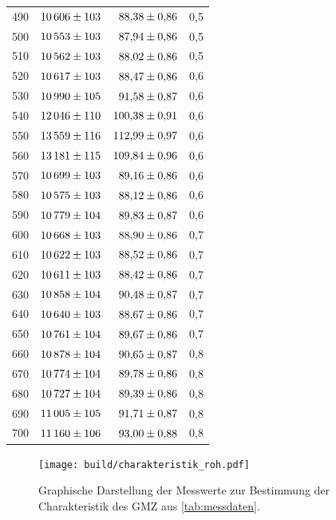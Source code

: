 \begin{longtable}{c r r c}
    490 & $\num{10606+-103}$ & $\num{ 88.38+-0.86}$ & 0,5 \\
    500 & $\num{10553+-103}$ & $\num{ 87.94+-0.86}$ & 0,5 \\
    510 & $\num{10562+-103}$ & $\num{ 88.02+-0.86}$ & 0,5 \\
    520 & $\num{10617+-103}$ & $\num{ 88.47+-0.86}$ & 0,6 \\
    530 & $\num{10990+-105}$ & $\num{ 91.58+-0.87}$ & 0,6 \\
    540 & $\num{12046+-110}$ & $\num{100.38+-0.91}$ & 0,6 \\
    550 & $\num{13559+-116}$ & $\num{112.99+-0.97}$ & 0,6 \\
    560 & $\num{13181+-115}$ & $\num{109.84+-0.96}$ & 0,6 \\
    570 & $\num{10699+-103}$ & $\num{ 89.16+-0.86}$ & 0,6 \\
    580 & $\num{10575+-103}$ & $\num{ 88.12+-0.86}$ & 0,6 \\
    590 & $\num{10779+-104}$ & $\num{ 89.83+-0.87}$ & 0,6 \\
    600 & $\num{10668+-103}$ & $\num{ 88.90+-0.86}$ & 0,7 \\
    610 & $\num{10622+-103}$ & $\num{ 88.52+-0.86}$ & 0,7 \\
    620 & $\num{10611+-103}$ & $\num{ 88.42+-0.86}$ & 0,7 \\
    630 & $\num{10858+-104}$ & $\num{ 90.48+-0.87}$ & 0,7 \\
    640 & $\num{10640+-103}$ & $\num{ 88.67+-0.86}$ & 0,7 \\
    650 & $\num{10761+-104}$ & $\num{ 89.67+-0.86}$ & 0,7 \\
    660 & $\num{10878+-104}$ & $\num{ 90.65+-0.87}$ & 0,8 \\
    670 & $\num{10774+-104}$ & $\num{ 89.78+-0.86}$ & 0,8 \\
    680 & $\num{10727+-104}$ & $\num{ 89.39+-0.86}$ & 0,8 \\
    690 & $\num{11005+-105}$ & $\num{ 91.71+-0.87}$ & 0,8 \\
    700 & $\num{11160+-106}$ & $\num{ 93.00+-0.88}$ & 0,8 \\
    \bottomrule
\end{longtable}

\begin{figure}[H]
    \centering
    \texttt{[image: build/charakteristik\_roh.pdf]}
    \caption{Graphische Darstellung der Messwerte zur Bestimmung der Charakteristik des GMZ aus%
    \autoref{tab:messdaten}.}
    \label{fig:charakteristik_roh}
\end{figure}

